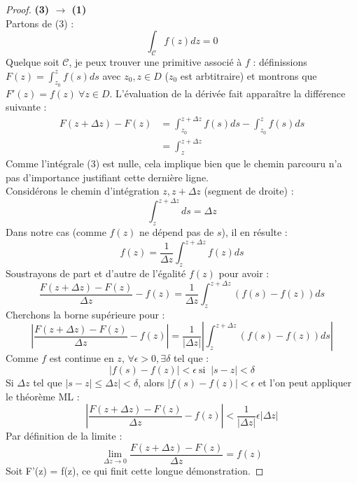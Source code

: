 \begin{proof}
    \textbf{(3) $\rightarrow$ (1)}\\
    Partons de (3) :
    \begin{equation}
    \int_\mathcal{C} f(z) dz = 0
    \end{equation}
    Quelque soit $\mathcal{C}$, je peux trouver une primitive associé à $f$ : 
    définissions $F(z) = \int_{z_0}^{z} f(s) ds$ avec $z_0,z \in D$ ($z_0$ est 
    arbtitraire) et montrons que  $F'(z) = f(z)\ \forall z \in D$. L'évaluation de la
    dérivée fait apparaître la différence suivante :
    \begin{equation}
    \begin{array}{ll}
     F(z+\Delta z) - F(z) &= \int_{z_0}^{z+\Delta z} f(s) ds - \int_{z_0}^z f(s)ds\\
     &= \int_{z}^{z+\Delta z} 
    \end{array}
    \end{equation}
    Comme l'intégrale (3) est nulle, cela implique bien que le chemin parcouru n'a pas
    d'importance justifiant cette dernière ligne.\\
    Considérons le chemin d'intégration $z,z+\Delta z$ (segment de droite) :
    \begin{equation}
    \int_z^{z+\Delta z} ds = \Delta z
    \end{equation}
    Dans notre cas (comme $f(z)$ ne dépend pas de $s$), il en résulte :
    \begin{equation}
    f(z) = \frac{1}{\Delta z} \int_z^{z+\Delta z} f(z) ds
    \end{equation}
    Soustrayons de part et d'autre de l'égalité $f(z)$ pour avoir :
    \begin{equation}
    \dfrac{F(z+\Delta z) - F(z)}{\Delta z} - f(z) = \dfrac{1}{\Delta z}\int_z^{z+
    \Delta z} (f(s)-f(z)) ds
    \end{equation}
    Cherchons la borne supérieure pour :
    \begin{equation}
    \left|\dfrac{F(z+\Delta z) - F(z)}{\Delta z} - f(z)\right| = \dfrac{1}{|\Delta z|}
    |\int_z^{z+ \Delta z} (f(s)-f(z)) ds|
    \end{equation}
    Comme $f$ est continue en $z$, $\forall \epsilon > 0, \exists \delta$ tel que :
    \begin{equation}
    |f(s)-f(z)|<\epsilon\ \text{si }\ |s-z| < \delta
    \end{equation}
    Si $\Delta z$ tel que $|s-z|\leq \Delta z | < \delta$, alors $|f(s)-f(z)|<\epsilon$
     et l'on peut appliquer le théorème ML :
    \begin{equation}
    \left|\dfrac{F(z+\Delta z) - F(z)}{\Delta z} - f(z)\right| < \dfrac{1}{|\Delta z|}
    \epsilon|\Delta z|
    \end{equation}
    Par définition de la limite :
    \begin{equation}
    \lim\limits_{\Delta z \rightarrow 0} \dfrac{F(z+\Delta z) - F(z)}{\Delta z} = f(z)
    \end{equation}
    Soit F'(z) = f(z), ce qui finit cette longue démonstration.
    \end{proof}
